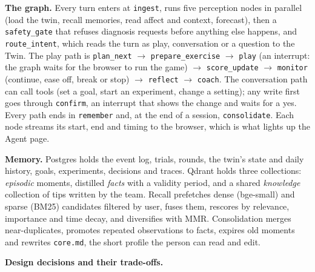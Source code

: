 \documentclass[10pt,a4paper]{article}
\begin{document}
\textbf{The graph.} Every turn enters at \texttt{ingest}, runs five perception nodes in parallel
(load the twin, recall memories, read affect and context, forecast), then a \texttt{safety\_gate}
that refuses diagnosis requests before anything else happens, and \texttt{route\_intent}, which
reads the turn as play, conversation or a question to the Twin. The play path is
\texttt{plan\_next} $\to$ \texttt{prepare\_exercise} $\to$ \texttt{play} (an interrupt: the graph
waits for the browser to run the game) $\to$ \texttt{score\_update} $\to$ \texttt{monitor}
(continue, ease off, break or stop) $\to$ \texttt{reflect} $\to$ \texttt{coach}. The conversation path
can call tools (set a goal, start an experiment, change a setting); any write first goes through
\texttt{confirm}, an interrupt that shows the change and waits for a yes. Every path ends in
\texttt{remember} and, at the end of a session, \texttt{consolidate}. Each node streams its start,
end and timing to the browser, which is what lights up the Agent page.

\textbf{Memory.} Postgres holds the event log, trials, rounds, the twin's state and daily history,
goals, experiments, decisions and traces. Qdrant holds three collections: \emph{episodic} moments,
distilled \emph{facts} with a validity period, and a shared \emph{knowledge} collection of tips
written by the team. Recall prefetches dense (bge-small) and sparse (BM25) candidates filtered by
user, fuses them, rescores by relevance, importance and time decay, and diversifies with MMR.
Consolidation merges near-duplicates, promotes repeated observations to facts, expires old moments
and rewrites \texttt{core.md}, the short profile the person can read and edit.

\textbf{Design decisions and their trade-offs.}
\end{document}
